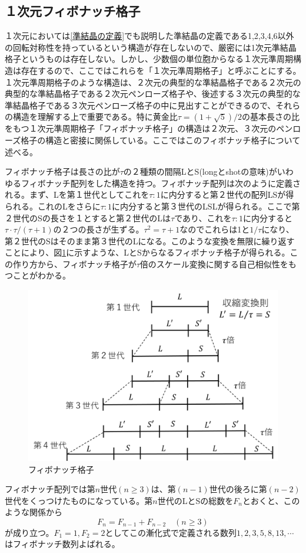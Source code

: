 \documentclass[11pt,a4j]{jreport}
\begin{document}
\subsection{１次元フィボナッチ格子}
１次元においては\ref{準結晶の定義}でも説明した準結晶の定義である1,2,3,4,6以外の回転対称性を持っているという構造が存在しないので、厳密には1次元準結晶格子というものは存在しない。しかし、少数個の単位胞からなる１次元準周期構造は存在するので、ここではこれらを「１次元準周期格子」と呼ぶことにする。１次元準周期格子のような構造は、２次元の典型的な準結晶格子である２次元の典型的な準結晶格子である２次元ペンローズ格子や、後述する３次元の典型的な準結晶格子である３次元ペンローズ格子の中に見出すことができるので、それらの構造を理解する上で重要である。特に黄金比$\tau=(1+\sqrt5)/2$の基本長さの比をもつ１次元準周期格子「フィボナッチ格子」の構造は２次元、３次元のペンローズ格子の構造と密接に関係している。ここではこのフィボナッチ格子について述べる。\par
フィボナッチ格子は長さの比が$\tau$の２種類の間隔LとS(longとshotの意味)がいわゆるフィボナッチ配列をした構造を持つ。フィボナッチ配列は次のように定義される。まず、Lを第１世代としてこれを$\tau:1$に内分すると第２世代の配列LSが得られる。これのLをさらに$\tau:1$に内分すると第３世代のLSLが得られる。ここで第２世代のSの長さを１とすると第２世代のLは$\tau$であり、これを$\tau:1$に内分すると$\tau\cdot\tau/(\tau+1)$の２つの長さが生ずる。$\tau^2=\tau+1$なのでこれらは1と$1/\tau$になり、第２世代のSはそのまま第３世代のLになる。このような変換を無限に繰り返すことにより、図\ref{fibonacci_lattice}に示すような、LとSからなるフィボナッチ格子が得られる。この作り方から、フィボナッチ格子が$\tau$倍のスケール変換に関する自己相似性をもつことがわかる。
\begin{figure}[htbp]
  \centering
  \vspace{10mm}
  \includegraphics[width=120mm]{./figure/fibonacci_lattice.png}
  \caption{フィボナッチ格子}
  \label{fibonacci_lattice}
\end{figure}
フィボナッチ配列では第$n$世代$(n\ge3)$は、第$(n-1)$世代の後ろに第$(n-2)$世代をくっつけたものになっている。第$n$世代のLとSの総数を$F_n$とおくと、このような関係から
\begin{equation}
  F_n = F_{n-1}+F_{n-2}\quad (n\ge3)
\end{equation}
が成り立つ。$F_1=1,F_2=2$としてこの漸化式で定義される数列$1,2,3,5,8,13,\cdots$はフィボナッチ数列よばれる。
\end{document}

